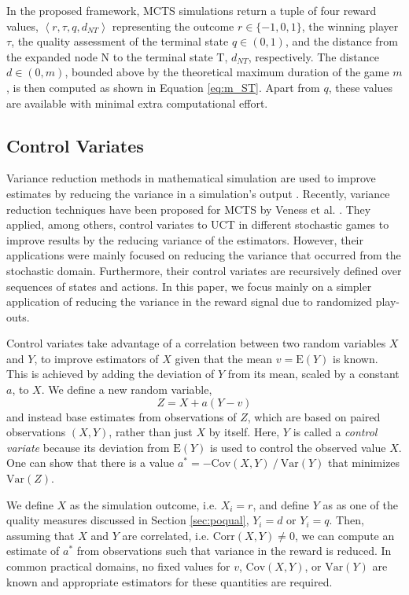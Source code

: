 \documentclass{ecai2014}
\newcommand\todo[1]{\textcolor{red}{#1}}
\newcommand{\tuple}[1]{\ensuremath{\left \langle #1 \right \rangle }}
\newcommand{\node}[1]{{\fontfamily{phv}\selectfont#1}}
\newcommand{\E}[1]{\mathrm{E}\left( #1 \right)}
\newcommand{\Var}[1]{\mathrm{Var}\left( #1 \right)}
\newcommand{\Cov}[1]{\mathrm{Cov}\left( #1 \right)}
\newcommand{\Corr}[1]{\mathrm{Corr}\left( #1 \right)}
\begin{document}
In the proposed framework, MCTS simulations return a tuple of four reward values, $\tuple{r,\tau,q,d_{NT}}$ representing the outcome $r\in\{-1, 0, 1\}$, the winning player $\tau$, the quality assessment of the terminal state $q\in(0, 1)$, and the distance from the expanded node \node{N} to the terminal state \node{T}, $d_{NT}$, respectively. The distance $d\in(0, m)$, bounded above by the theoretical maximum duration of the game $m$, is then computed as shown in Equation \ref{eq:m_ST}. Apart from $q$, these values are available with minimal extra computational effort.

\subsection{Control Variates}
\label{sub:cv}
Variance reduction methods in mathematical simulation are used to improve estimates by reducing the variance in a simulation's output \cite{kelton2000simulation}. Recently, variance reduction techniques have been proposed for MCTS by Veness et al. \cite{Veness11variance}. They applied, among others, control variates to UCT in different stochastic games to improve results by the reducing variance of the estimators. However, their applications were mainly focused on reducing the variance that occurred from the stochastic domain. Furthermore, their control variates are recursively defined over sequences of states and actions. In this paper, we focus mainly on a simpler application of reducing the variance in the reward signal due to randomized play-outs.  

Control variates take advantage of a correlation between two random variables $X$ and $Y$, to improve estimators of $X$ given that the mean $v=\E{Y}$ is known. This is achieved by adding the deviation of $Y$ from its mean, scaled by a constant $a$, to $X$. We define a new random variable, 
\begin{equation}
Z=X+a\left(Y-v\right)
\end{equation}
and instead base estimates from observations of $Z$, which are based on paired observations $(X,Y)$, rather than just $X$ by itself. 
Here, $Y$ is called a {\it control variate} because its deviation from $\E{Y}$ is used to control the observed value $X$. 
One can show that there is a value $a^*=-\Cov{X,Y}\mathbin{/}\Var{Y}$ that minimizes $\Var{Z}$.

We define $X$ as the simulation outcome, i.e. $X_i=r$, and define $Y$ as as one of the quality measures discussed in Section \ref{sec:poqual}, $Y_i=d$ or $Y_i=q$. Then, assuming that $X$ and $Y$ are correlated, i.e. $\Corr{X,Y}\neq0$, we can compute an estimate of  $a^*$ from observations such that variance in the reward is reduced. In common practical domains, no fixed values for $v$, $\Cov{X,Y}$, or $\Var{Y}$ are known and appropriate estimators for these quantities are required.
\end{document}
